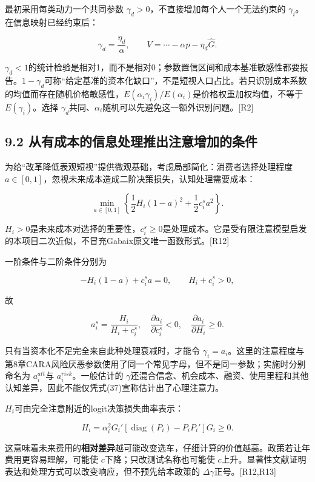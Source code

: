 \documentclass[
  11pt,
]{article}
\begin{document}
最初采用每类动力一个共同参数
\(\gamma_d>0\)，不直接增加每个人一个无法约束的
\(\gamma_i\)。在信息映射已经约束后：

\[
\gamma_d=\frac{\eta_d}{\alpha},\qquad
V=\cdots-\alpha p-\eta_d\widehat G.
\tag{35}
\]

\(\gamma_d<1\)的统计检验是相对1，而不是相对0；参数置信区间和成本基准敏感性都要报告。\(1-\gamma_d\)可称``给定基准的资本化缺口''，不是短视人口占比。若只识别成本系数的均值而存在随机价格敏感性，\(E(\alpha_i\gamma_i)/E(\alpha_i)\)是价格权重加权均值，不等于
\(E(\gamma_i)\)。选择
\(\gamma_d\)共同、\(\alpha_i\)随机可以先避免这一额外识别问题。{[}R2{]}

\subsection{9.2
从有成本的信息处理推出注意增加的条件}\label{ux4eceux6709ux6210ux672cux7684ux4fe1ux606fux5904ux7406ux63a8ux51faux6ce8ux610fux589eux52a0ux7684ux6761ux4ef6}

为给``改革降低表观短视''提供微观基础，考虑局部简化：消费者选择处理程度
\(a\in[0,1]\)，忽视未来成本造成二阶决策损失，认知处理需要成本：

\[
\min_{a\in[0,1]}
\left\{\frac12H_i(1-a)^2+\frac12c_i^sa^2\right\}.
\tag{36}
\]

\(H_i>0\)是未来成本对选择的重要性，\(c_i^s\geq0\)是处理成本。它是受有限注意模型启发的本项目二次近似，不冒充Gabaix原文唯一函数形式。{[}R12{]}

一阶条件与二阶条件分别为

\[
-H_i(1-a)+c_i^sa=0,\qquad H_i+c_i^s>0,
\]

故

\[
a_i^s=\frac{H_i}{H_i+c_i^s},\quad
\frac{\partial a_i}{\partial c_i^s}<0,\quad
\frac{\partial a_i}{\partial H_i}\geq0.
\tag{37}
\]

只有当资本化不足完全来自此种处理衰减时，才能令
\(\gamma_i=a_i\)。这里的注意程度与第8章CARA风险厌恶参数使用了同一个常见字母，但不是同一参数；实施时分别命名为
\(a_i^{att}\)与 \(a_i^{risk}\)。一般估计的
\(\gamma\)还混合信念、机会成本、融资、使用里程和其他认知差异，因此不能仅凭式(37)宣称估计出了心理注意力。

\(H_i\)可由完全注意附近的logit决策损失曲率表示：

\[
H_i=\alpha_i^2G_i'
[\operatorname{diag}(P_i)-P_iP_i']G_i\geq0.
\tag{38}
\]

这意味着未来费用的\textbf{相对差异}越可能改变选车，仔细计算的价值越高。政策若让年费用更容易理解，可能使
\(c\)下降；只改测试名称也可能使
\(c\)上升。显著性文献证明表达和处理方式可以改变响应，但不预先给本政策的
\(\Delta\gamma\)正号。{[}R12,R13{]}
\end{document}
